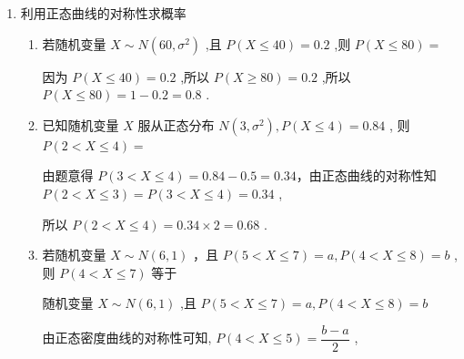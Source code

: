 \begin{enumerate}
\begin{enumerate}
\begin{jieda}
            因为 $P\left( {x \leq  {\mu }_{2}}\right)  > {0.5},P\left( {Y \leq  {\mu }_{1}}\right)  < {0.5}$ ,所以 ${D}$ 正确;
        \end{jieda}
    \end{enumerate}
    \item 利用正态曲线的对称性求概率
    \begin{enumerate}
        \item 若随机变量 $X \sim  N\left( {{60},{\sigma }^{2}}\right)$ ,且 $P\left( {X \leq  {40}}\right)  = {0.2}$ ,则 $P\left( {X \leq  {80}}\right)  =$
        \begin{jieda}
            因为 $P\left( {X \leq  {40}}\right)  = {0.2}$ ,所以 $P\left( {X \geq  {80}}\right)  = {0.2}$ ,所以 $P\left( {X \leq  {80}}\right)  = 1 - {0.2} = {0.8}$ .
        \end{jieda}
        \item 已知随机变量 $X$ 服从正态分布 $N\left( {3,{\sigma }^{2}}\right) ,P\left( {X \leq  4}\right)  = {0.84}$ , 则 $P\left( {2 < X \leq  4}\right)  =$
        \begin{jieda}
            由题意得 $P\left( {3 < X \leq  4}\right)  = {0.84} - {0.5} = {0.34}$，由正态曲线的对称性知 $P\left( {2 < X \leq  3}\right)  = P\left( {3 < X \leq  4}\right)  = {0.34}$ ,
            
            所以 $P\left( {2 < X \leq  4}\right)  = {0.34} \times  2 = {0.68}$ .
        \end{jieda}
        
        \item 若随机变量 $X \sim  N\left( {6,1}\right)$ ，且 $P\left( {5 < X \leq  7}\right)  = a,P\left( {4 < X \leq  8}\right)  = b$ ,则 $P\left( {4 < X \leq  7}\right)$ 等于
        \begin{jieda}
            随机变量 $X \sim  N\left( {6,1}\right)$ ,且 $P\left( {5 < X \leq  7}\right)  = a,P\left( {4 < X \leq  8}\right)  = b$
            
            由正态密度曲线的对称性可知, $P\left( {4 < X \leq  5}\right)  = \dfrac{b - a}{2}$ ,
            

\end{jieda}
\end{enumerate}
\end{enumerate}
